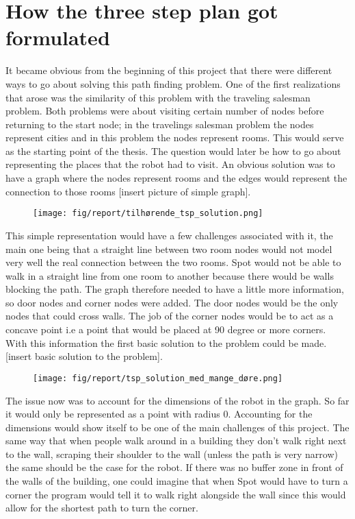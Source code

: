 \section{How the three step plan got formulated}
It became obvious from the beginning of this project that there were different ways to go about solving this path finding problem. One of the first realizations that arose was the similarity of this problem with the traveling salesman problem. Both problems were about visiting certain number of nodes before returning to the start node; in the travelings salesman problem the nodes represent cities and in this problem the nodes represent rooms. This would serve as the starting point of the thesis. The question would later be how to go about representing the places that the robot had to visit. An obvious solution was to have a graph where the nodes represent rooms and the edges would represent the connection to those rooms [insert picture of simple graph].

\begin{figure}[H]
    \centering
    \texttt{[image: fig/report/tilhørende\_tsp\_solution.png]}
    \label{}
    \caption[Design overview]{}
\end{figure}

This simple representation would have a few challenges associated with it, the main one being that a straight line between two room nodes would not model very well the real connection between the two rooms. Spot would not be able to walk in a straight line from one room to another because there would be walls blocking the path. 
The graph therefore needed to have a little more information, so door nodes and corner nodes were added. The door nodes would be the only nodes that could cross walls. The job of the corner nodes would be to act as a concave point i.e a point that would be placed at 90 degree or more corners. With this information the first basic solution to the problem could be made. [insert basic solution to the problem].
\begin{figure}[H]
    \centering
    \texttt{[image: fig/report/tsp\_solution\_med\_mange\_døre.png]}
    \label{}
    \caption[Design overview]{}
\end{figure}

The issue now was to account for the dimensions of the robot in the graph. So far it would only be represented as a point with radius 0. Accounting for the dimensions would show itself to be one of the main challenges of this project. 
The same way that when people walk around in a building they don't walk right next to the wall, scraping their shoulder to the wall (unless the path is very narrow) the same should be the case for the robot. If there was no buffer zone in front of the walls of the building, one could imagine that when Spot would have to turn a corner the program would tell it to walk right alongside the wall since this would allow for the shortest path to turn the corner.


